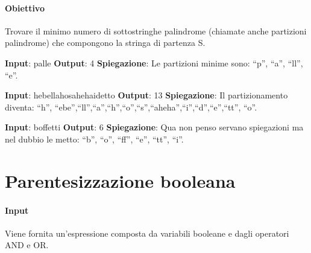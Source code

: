     \paragraph{Obiettivo} Trovare il minimo numero di sottostringhe palindrome (chiamate anche partizioni palindrome) che compongono la stringa di partenza S.
    \begin{esempio}
        \newline
        \textbf{Input}: palle
        \newline
        \textbf{Output}: 4
        \newline
        \textbf{Spiegazione}: Le partizioni minime sono: ``p'', ``a'', ``ll'', ``e''.
    \end{esempio}
    \begin{esempio}
        \newline
        \textbf{Input}: hebellahosahehaidetto
        \newline
        \textbf{Output}: 13
        \newline
        \textbf{Spiegazione}: Il partizionamento diventa: ``h'', ``ebe'',``ll'',``a'',``h'',``o'',``s'',``aheha'',``i'',``d'',``e'',``tt'', ``o''.
    \end{esempio}
    \begin{esempio}
        \newline
        \textbf{Input}: boffetti
        \newline
        \textbf{Output}: 6
        \newline
        \textbf{Spiegazione}: Qua non penso servano spiegazioni ma nel dubbio le metto: ``b'', ``o'', ``ff'', ``e'', ``tt'', ``i''.
    \end{esempio}

\newpage
\thispagestyle{chapterInit}
\section*{Parentesizzazione booleana}
    \paragraph{Input} Viene fornita un'espressione composta da variabili booleane e dagli operatori AND e OR.

